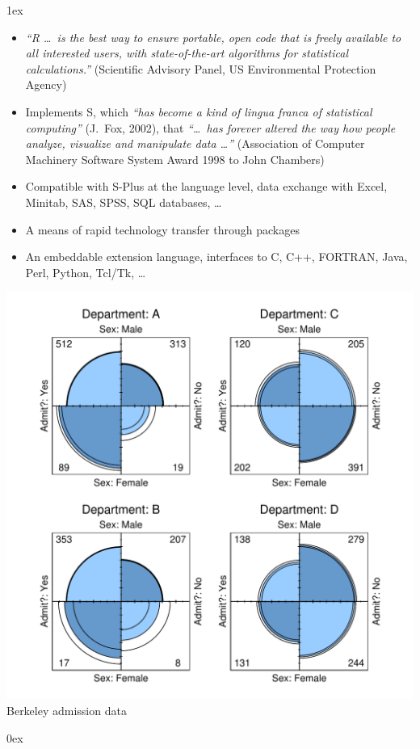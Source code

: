 \documentclass[landscape]{article}
\newlength{\colw}
\newcommand{\column}[1]{\hspace*{9mm}{}
  \parbox[t][0.99\textheight][t]{\colw}{\parskip1ex
    #1\parskip0ex}\hspace{9mm}{}}
\begin{document}
\noindent
\column{
  \begin{itemize}
   \item \emph{``R \ldots\ is the best way to ensure portable, open code that
    is freely available to all interested users, with state-of-the-art
    algorithms for statistical calculations.''} (Scientific Advisory
    Panel, US Environmental Protection Agency)
   \item Implements S, which \emph{``has become a kind of lingua
      franca of statistical computing''} (J.\ Fox, 2002),
    that \emph{``\ldots\ has forever
      altered the way how people analyze, visualize and manipulate data
      \ldots''} (Association of Computer Machinery Software System
      Award 1998 to John Chambers)
   \item Compatible with S-Plus at the language level, data exchange
    with Excel, Minitab, SAS, SPSS, SQL databases, \ldots
   \item A means of rapid technology transfer through packages
   \item An embeddable extension language, interfaces to C, C++,
    FORTRAN, Java, Perl, Python, Tcl/Tk, \ldots
  \end{itemize}

  \vfill
  \begin{center}
    \footnotesize
    \includegraphics[width=0.9\colw]{fourfoldplot}
    \sf Berkeley admission data
  \end{center}
  }
\end{document}
